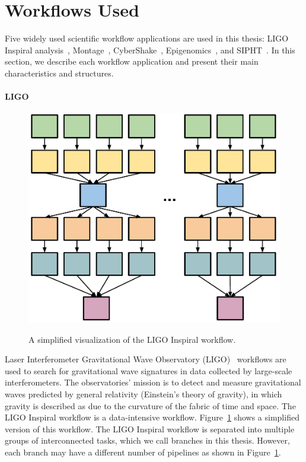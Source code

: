 \section{Workflows Used}
\label{sec:applications}

Five widely used scientific workflow applications are used in this thesis: LIGO Inspiral analysis~\cite{LIGO}, Montage~\cite{Berriman2004}, CyberShake~\cite{Graves2010}, Epigenomics~\cite{Epigenome}, and SIPHT~\cite{SIPHT}. In this section, we describe each workflow application and present their main characteristics and structures.

\paragraph{\textbf{LIGO}}
\begin{figure}[!htb]
	\centering
	\includegraphics[width=0.5\linewidth]{figures/workflowsim/ligo_shape.pdf} \\
	\caption{A simplified visualization of the LIGO Inspiral workflow.}
	\label{fig:model_shape_ligo}
\end{figure}
Laser Interferometer Gravitational Wave Observatory (LIGO)~\cite{LIGO} workflows are used to search for gravitational wave signatures in data collected by large-scale interferometers. The observatories' mission is to detect and measure gravitational waves predicted by general relativity (Einstein's theory of gravity), in which gravity is described as due to the curvature of the fabric of time and space. The LIGO Inspiral workflow is a data-intensive workflow. Figure~\ref{fig:model_shape_ligo} shows a simplified version of this workflow. The LIGO Inspiral workflow is separated into multiple groups of interconnected tasks, which we call branches in this thesis. However, each branch may have a different number of pipelines as shown in Figure~\ref{fig:model_shape_ligo}. 

